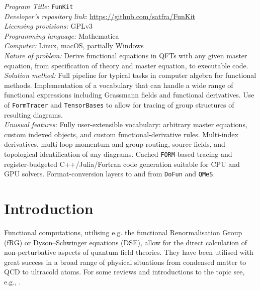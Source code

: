 \documentclass[preprint,10pt,sort&compress]{elsarticle}
\newcommand{\FunKit}{\texttt{FunKit}\xspace}
\newcommand{\TensorBases}{\texttt{TensorBases}\xspace}
\newcommand{\FormTracer}{\texttt{FormTracer}\xspace}
\newcommand{\QMeS}{\texttt{QMeS}\xspace}
\newcommand{\DoFun}{\texttt{DoFun}\xspace}
\newcommand{\FORM}{\texttt{FORM}\xspace}
\begin{document}
\begin{small}
	\noindent
	{\em Program Title:} \FunKit \\
	{\em Developer's repository link}:  \url{https://github.com/satfra/FunKit} \\
	{\em Licensing provisions:} GPLv3                                   \\
	{\em Programming language:} Mathematica                                  \\
	{\em Computer:}  Linux, macOS, partially Windows                           \\
	{\em Nature of problem:} Derive functional equations in QFTs with any given master equation, from specification of theory and master equation, to executable code.\\
	{\em Solution method:} Full pipeline for typical tasks in computer algebra for functional methods. Implementation of a vocabulary that can handle a wide range of functional expressions including Grassmann fields and functional derivatives. Use of \FormTracer \cite{Cyrol:2016zqb} and \TensorBases \cite{Braun:2025gvq} to allow for tracing of group structures of resulting diagrams. \\
	{\em Unusual features:} Fully user-extensible vocabulary: arbitrary master equations, custom indexed objects, and custom functional-derivative rules. Multi-index derivatives, multi-loop momentum and group routing, source fields, and topological identification of any diagrams. Cached \FORM-based tracing and register-budgeted C++/Julia/Fortran code generation suitable for CPU and GPU solvers. Format-conversion layers to and from \DoFun and \QMeS.	\\
\end{small}

\vspace{-0.7cm}

\tableofcontents

\section{Introduction}
\label{sec:Introduction}

Functional computations, utilising e.g. the functional Renormalisation Group (fRG) or Dyson--Schwinger equations (DSE), allow for the direct calculation of non-perturbative aspects of quantum field theories. They have been utilised with great success in a broad range of physical situations from condensed matter to QCD to ultracold atoms. For some reviews and introductions to the topic see, e.g., \cite{Roberts:1994dr,Roberts:2000aa,Berges:2000ew,Maris:2003vk,Pawlowski:2005xe,Gies:2006wv,Fischer:2006ub,Delamotte:2007pf,Rosten:2010vm,Metzner_2012,Bashir:2012fs,Fischer:2018sdj,Dupuis:2020fhh,Pawlowski:2020qer,Fu:2022gou,Fischer:2026uni}.
\end{document}
